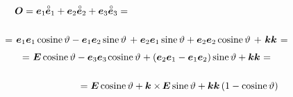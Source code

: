 \begin{figure}[!htbp]
\vspace{-1em}
\begin{multline*}
\shoveleft{ \rotationtensor = \bm{e}_1 \hspace{-0.1ex} \mathcircabove{\bm{e}}_1 + \bm{e}_2 \mathcircabove{\bm{e}}_2 + \bm{e}_3 \mathcircabove{\bm{e}}_3 = \hfill }\\[1.5em]
%
= \hspace{.2ex} \tikzmark{StartBraceE1E1} {\bm{e}_1 \bm{e}_1 \cosine \vartheta - \bm{e}_1 \bm{e}_2 \sine \vartheta \hspace{.2em}} \tikzmark{EndBraceE1E1} \hspace{-0.1ex} + \hspace{.1ex} \tikzmark{StartBraceE2E2} {\bm{e}_2 \bm{e}_1 \sine \vartheta + \bm{e}_2 \bm{e}_2 \cosine \vartheta \hspace{.2em}} \tikzmark{EndBraceE2E2} \hspace{-0.1ex} + \tikzmark{StartBraceE3E3} {\hspace{.25ex} \bm{k} \bm{k} \hspace{.1ex}} \tikzmark{EndBraceE3E3} \hspace{.1ex}
=\\[0.32em]
%
= \hspace{.1ex} \UnitDyad \cosine \vartheta - \hspace{-0.1ex} \tikzmark{StartBraceKk} {\hspace{.1ex}\bm{e}_3 \bm{e}_3\hspace{.1ex}} \tikzmark{EndBraceKk} \hspace{-0.25ex} \cosine \vartheta \hspace{.1ex} + \tikzmark{StartBraceSkewsymmetry} {\left( \bm{e}_2 \bm{e}_1 - \bm{e}_1 \bm{e}_2 \right)} \tikzmark{EndBraceSkewsymmetry} \sine \vartheta + \bm{k} \bm{k} \hspace{.1ex}
=\\[1.5em]
%
\shoveright{ \hfill = \UnitDyad \cosine \vartheta + \bm{k} \times \hspace{-0.2ex} \UnitDyad \sine \vartheta + \bm{k} \bm{k} \left({1 - \cosine \vartheta}\right) }
\end{multline*}


\vspace{-0.5em}
\caption{}\label{fig:eulerfiniterotation}
\end{figure}
